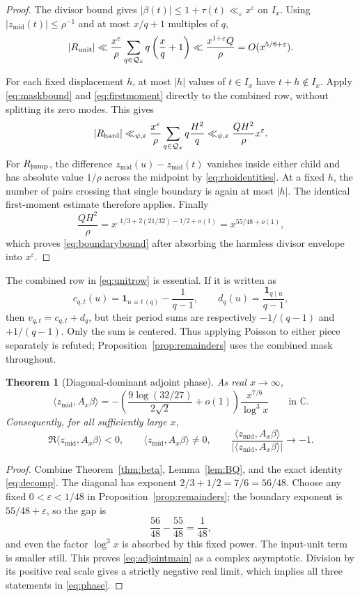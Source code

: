 \documentclass[10pt]{article}
\newtheorem{theorem}{Theorem}
\newcommand{\one}{\mathbf 1}
\newcommand{\ip}[2]{\langle #1,#2\rangle}
\newcommand{\zm}{z_{\mathrm{mid}}}
\newcommand{\Ax}{A_x}
\newcommand{\Qx}{\mathcal Q_x}
\newcommand{\e}{\varepsilon}
\begin{document}
\begin{proof}
The divisor bound gives $|\beta(t)|\leq1+\tau(t)\ll_\e x^\e$ on $I_x$.
Using $|\zm(t)|\leq\rho^{-1}$ and at most $x/q+1$ multiples of $q$,
\[
 |R_{\rm unit}|\ll\frac{x^\e}{\rho}
   \sum_{q\in\Qx}q\left(\frac{x}{q}+1\right)
 \ll \frac{x^{1+\e}Q}{\rho}=O(x^{5/6+\e}).
\]

For each fixed displacement $h$, at most $|h|$ values of $t\in I_x$ have
$t+h\notin I_x$.  Apply \eqref{eq:maskbound} and
\eqref{eq:firstmoment} directly to the combined row, without splitting its
zero modes.  This gives
\[
 |R_{\rm hard}|\ll_{\psi,\e}
 \frac{x^\e}{\rho}\sum_{q\in\Qx}q\frac{H^2}{q}
 \ll_{\psi,\e}\frac{QH^2}{\rho}x^\e.
\]
For $R_{\rm jump}$, the difference $\zm(u)-\zm(t)$ vanishes inside either
child and has absolute value $1/\rho$ across the midpoint by
\eqref{eq:rhoidentities}.  At a fixed $h$, the number of pairs crossing that
single boundary is again at most $|h|$.  The identical first-moment estimate
therefore applies.  Finally
\[
 \frac{QH^2}{\rho}
 =x^{,1/3+2(21/32)-1/2+o(1)}=x^{55/48+o(1)},
\]
which proves \eqref{eq:boundarybound} after absorbing the harmless divisor
envelope into $x^\e$.
\end{proof}

The combined row in \eqref{eq:unitrow} is essential.  If it is written as
\[
 c_{q,t}(u)=\one_{u\equiv t\,(q)}-\frac1{q-1},\qquad
 d_q(u)=\frac{\one_{q\mid u}}{q-1},
\]
then $v_{q,t}=c_{q,t}+d_q$, but their period sums are respectively
$-1/(q-1)$ and $+1/(q-1)$.  Only the sum is centered.  Thus applying Poisson
to either piece separately is refuted; Proposition~\ref{prop:remainders}
uses the combined mask throughout.

\begin{theorem}[Diagonal-dominant adjoint phase]\label{thm:adjoint}
As real $x\to\infty$,
\begin{equation}
 \boxed{\displaystyle
 \ip{\zm}{\Ax\beta}
 =-\left(\frac{9\log(32/27)}{2\sqrt2}+o(1)\right)
       \frac{x^{7/6}}{\log^3x}}\qquad\text{in }\mathbb C.     \label{eq:adjointmain}
\end{equation}
Consequently, for all sufficiently large $x$,
\begin{equation}
 \Re\ip{\zm}{\Ax\beta}<0,\qquad \ip{\zm}{\Ax\beta}\ne0,
 \qquad
 \frac{\ip{\zm}{\Ax\beta}}{|\ip{\zm}{\Ax\beta}|}\longrightarrow-1. \label{eq:phase}
\end{equation}
\end{theorem}

\begin{proof}
Combine Theorem~\ref{thm:beta}, Lemma~\ref{lem:BQ}, and the exact identity
\eqref{eq:decomp}.  The diagonal has exponent
$2/3+1/2=7/6=56/48$.  Choose any fixed $0<\e<1/48$ in
Proposition~\ref{prop:remainders}; the boundary exponent is $55/48+\e$, so
the gap is
\[
 \frac{56}{48}-\frac{55}{48}=\frac1{48},
\]
and even the factor $\log^3x$ is absorbed by this fixed power.  The input-unit
term is smaller still.  This proves \eqref{eq:adjointmain} as a complex
asymptotic.  Division by its positive real scale gives a strictly negative
real limit, which implies all three statements in \eqref{eq:phase}.
\end{proof}
\end{document}
